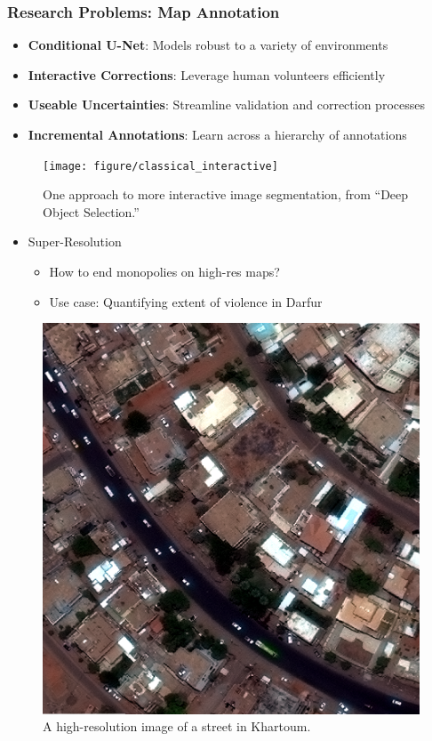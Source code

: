 \documentclass[10pt,mathserif]{beamer}
\begin{document}
\begin{frame}
  \frametitle{Research Problems: Map Annotation}
  \begin{itemize}
  \item \textbf{Conditional U-Net}: Models robust to a variety of environments
  \item \textbf{Interactive Corrections}: Leverage human volunteers efficiently
  \item \textbf{Useable Uncertainties}: Streamline validation and correction processes
  \item \textbf{Incremental Annotations}: Learn across a hierarchy of annotations
  \end{itemize}  
  \begin{figure}[ht]
    \centering
    \texttt{[image: figure/classical\_interactive]}
    \caption{One approach to more interactive image segmentation, from ``Deep
      Object Selection.'' \label{fig:label} }
  \end{figure}
\end{frame}

\begin{frame}
  \begin{itemize}
  \item Super-Resolution
    \begin{itemize}
    \item How to end monopolies on high-res maps?
    \item Use case: Quantifying extent of violence in Darfur
    \end{itemize}
  \end{itemize} 
  \begin{figure}[ht]
    \centering
    \includegraphics[width=0.4\paperwidth]{figures/high_res_khartoum}
    \caption{A high-resolution image of a street in Khartoum. \label{fig:label} }
  \end{figure}
\end{frame}
\end{document}
